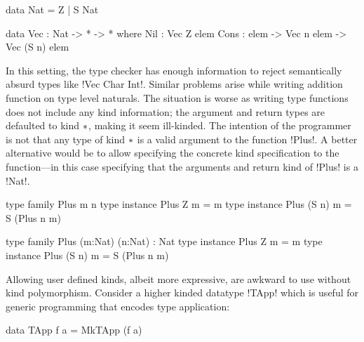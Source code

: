 \documentclass[manuscript,screen,nonacm]{acmart}
\begin{document}
\begin{minipage}[ht]{0.4\linewidth}
\begin{code}
data Nat = Z
         | S Nat
\end{code}
\end{minipage}%
\begin{minipage}[ht]{0.4\linewidth}
\begin{code}
data Vec : Nat -> * -> * where
   Nil : Vec Z elem
   Cons : elem -> Vec n elem -> Vec (S n) elem
\end{code}
\end{minipage}

In this setting, the type checker has enough information to reject semantically absurd types like !Vec Char Int!.
Similar problems arise while writing addition function on type level naturals. The situation is worse as writing type functions does not include any kind information; the argument and return types are defaulted to kind $\ast$, making it seem ill-kinded. The intention of the programmer is not that any type of kind $\ast$ is a valid argument to the function !Plus!. A better alternative would be to allow specifying the concrete kind specification to the function---in this case specifying that the arguments and return kind of !Plus! is a !Nat!.

\begin{minipage}[ht]{0.4\linewidth}
 \begin{code}
 type family Plus m n
 type instance Plus Z m = m
 type instance Plus (S n) m = S (Plus n m)
 \end{code}
\end{minipage}
\begin{minipage}[ht]{0.4\linewidth}
 \begin{code}
 type family Plus (m:Nat) (n:Nat) : Nat
 type instance Plus Z m = m
 type instance Plus (S n) m = S (Plus n m)
 \end{code}
\end{minipage}

Allowing user defined kinds, albeit more expressive, are awkward to use without kind polymorphism. Consider a higher kinded datatype !TApp! which is useful for generic programming that encodes type application:

\begin{CenteredBox}
\begin{code}
data TApp f a = MkTApp (f a)
\end{code}
\end{CenteredBox}
\end{document}
